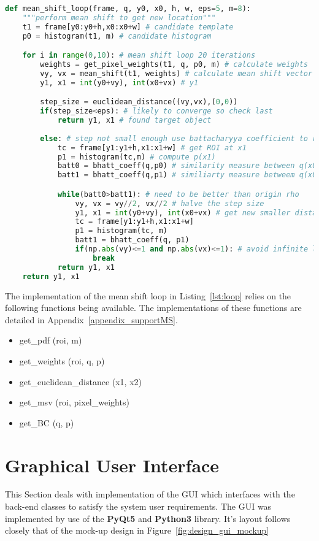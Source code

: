 \begin{lstlisting}[language=Python, caption={Mean shift loop}, captionpos=b, label={lst:loop}]
def mean_shift_loop(frame, q, y0, x0, h, w, eps=5, m=8):
    """perform mean shift to get new location"""
    t1 = frame[y0:y0+h,x0:x0+w] # candidate template
    p0 = histogram(t1, m) # candidate histogram

    for i in range(0,10): # mean shift loop 20 iterations
        weights = get_pixel_weights(t1, q, p0, m) # calculate weights
        vy, vx = mean_shift(t1, weights) # calculate mean shift vector
        y1, x1 = int(y0+vy), int(x0+vx) # y1

        step_size = euclidean_distance((vy,vx),(0,0))
        if(step_size<eps): # likely to converge so check last
            return y1, x1 # found target object
            
        else: # step not small enough use battacharyya coefficient to refine step
            tc = frame[y1:y1+h,x1:x1+w] # get ROI at x1
            p1 = histogram(tc,m) # compute p(x1)
            batt0 = bhatt_coeff(q,p0) # similarity measure between q(x0) and p(x0) 
            batt1 = bhatt_coeff(q,p1) # similiarty measure betweem q(x0) and p(x1)

            while(batt0>batt1): # need to be better than origin rho
                vy, vx = vy//2, vx//2 # halve the step size
                y1, x1 = int(y0+vy), int(x0+vx) # get new smaller distance 
                tc = frame[y1:y1+h,x1:x1+w]
                p1 = histogram(tc, m)
                batt1 = bhatt_coeff(q, p1)
                if(np.abs(vy)<=1 and np.abs(vx)<=1): # avoid infinite loop
                    break
            return y1, x1
    return y1, x1
\end{lstlisting}

The implementation of the mean shift loop in Listing~\ref{lst:loop} relies on
the following functions being available. The implementations of these functions
are detailed in Appendix~\ref{appendix_supportMS}.
\begin{itemize}
    \item get\_pdf (roi, m)
    \item get\_weights (roi, q, p)
    \item get\_euclidean\_distance (x1, x2)
    \item get\_msv (roi, pixel\_weights)
    \item get\_BC (q, p)
\end{itemize}

\section{Graphical User Interface}
This Section deals with implementation of the GUI which interfaces with the
back-end classes to satisfy the system user requirements.  The GUI was
implemented by use of the \textbf{PyQt5} and \textbf{Python3} library. It's
layout follows closely that of the mock-up design in
Figure~\ref{fig:design_gui_mockup}

